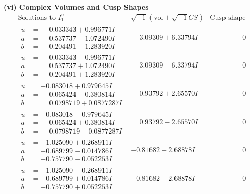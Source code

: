 \documentclass[1p]{elsarticle_modified}
\theoremstyle{definition}
\newcommand{\I}{\sqrt{-1}}
\begin{document}
\newpage\flushleft \textbf{(vi) Complex Volumes and Cusp Shapes}
$$\begin{array}{c|c|c}  
\text{Solutions to }I^u_{1}& \I (\text{vol} + \sqrt{-1}CS) & \text{Cusp shape}\\
 \hline 
\begin{aligned}
u &= \phantom{-}0.033343 + 0.996771 I \\
a &= \phantom{-}0.537737 - 1.072490 I \\
b &= \phantom{-}0.204491 - 1.283920 I\end{aligned}
 & \phantom{-}3.09309 + 6.33794 I & \phantom{-0.000000 } 0 \\ \hline\begin{aligned}
u &= \phantom{-}0.033343 - 0.996771 I \\
a &= \phantom{-}0.537737 + 1.072490 I \\
b &= \phantom{-}0.204491 + 1.283920 I\end{aligned}
 & \phantom{-}3.09309 - 6.33794 I & \phantom{-0.000000 } 0 \\ \hline\begin{aligned}
u &= -0.083018 + 0.979645 I \\
a &= \phantom{-}0.065424 - 0.380814 I \\
b &= \phantom{-}0.0798719 + 0.0877287 I\end{aligned}
 & \phantom{-}0.93792 + 2.65570 I & \phantom{-0.000000 } 0 \\ \hline\begin{aligned}
u &= -0.083018 - 0.979645 I \\
a &= \phantom{-}0.065424 + 0.380814 I \\
b &= \phantom{-}0.0798719 - 0.0877287 I\end{aligned}
 & \phantom{-}0.93792 - 2.65570 I & \phantom{-0.000000 } 0 \\ \hline\begin{aligned}
u &= -1.025090 + 0.268911 I \\
a &= -0.689799 - 0.014786 I \\
b &= -0.757790 - 0.052253 I\end{aligned}
 & -0.81682 - 2.68878 I & \phantom{-0.000000 } 0 \\ \hline\begin{aligned}
u &= -1.025090 - 0.268911 I \\
a &= -0.689799 + 0.014786 I \\
b &= -0.757790 + 0.052253 I\end{aligned}
 & -0.81682 + 2.68878 I & \phantom{-0.000000 } 0 \\ \hline\begin{aligned}

\end{aligned}
\end{array}$$
\end{document}
